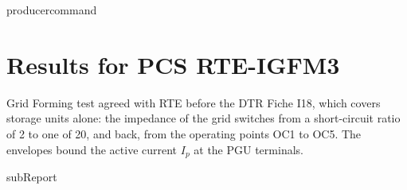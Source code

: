 {{ producercommand }}



    \section{Results for PCS RTE-IGFM3}

    Grid Forming test agreed with RTE before the DTR Fiche I18, which covers storage units
    alone: the impedance of the grid switches from a short-circuit ratio of 2 to one
    of 20, and back, from the operating points OC1 to OC5. The envelopes bound the active
    current \(I_p\) at the PGU terminals.

    {{subReport}}
    \newpage
